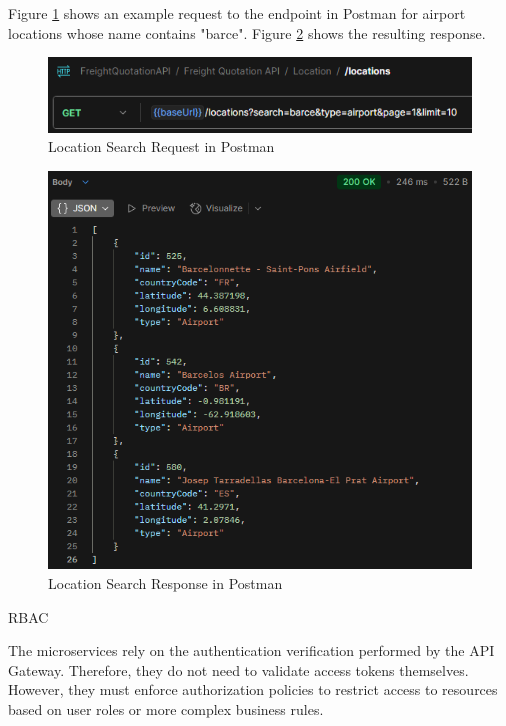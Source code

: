 \documentclass[12pt,reqno, oneside]{amsbook}
\makeatletter
\def\subsection{\@startsection{subsection}{2}%
      \z@{.5\linespacing\@plus.7\linespacing}{.25\linespacing}%
      {\normalfont\bfseries\flushleft}}
\theoremstyle{definition}
\theoremstyle{definition}
\numberwithin{section}{chapter}
\numberwithin{table}{chapter}
\numberwithin{figure}{chapter}
\makeatother
\begin{document}
Figure \ref{Figure:LocationSearchRequestPostman} shows an example request to the endpoint in Postman for airport locations whose name contains "barce". Figure \ref{Figure:LocationSearchResponsePostman} shows the resulting response.

\begin{figure}[H]
  \centering
  \includegraphics[width=0.9\linewidth]{images/LocationSearchRequestPostman.png}
  \caption{\label{Figure:LocationSearchRequestPostman}Location Search Request in Postman}
\end{figure}

\begin{figure}[H]
  \centering
  \includegraphics[width=0.8\linewidth]{images/LocationSearchResponsePostman.png}
  \caption{\label{Figure:LocationSearchResponsePostman}Location Search Response in Postman}
\end{figure}

\pagebreak

\subsection{\texorpdfstring{\ac{RBAC}}{RBAC}}

The microservices rely on the authentication verification performed by the \ac{API} Gateway. Therefore, they do not need to validate access tokens themselves. However, they must enforce authorization policies to restrict access to resources based on user roles or more complex business rules.
\end{document}
